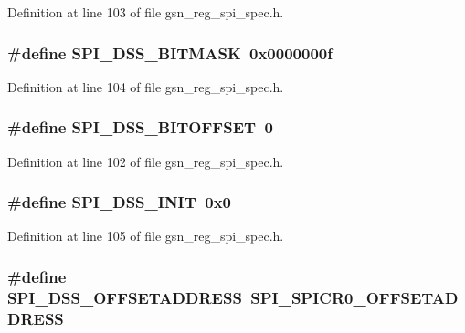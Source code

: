 Definition at line 103 of file gsn\_\-reg\_\-spi\_\-spec.h.

\hypertarget{a00573_acc736a501ece37e3af089e36aef09e1a}{
\subsubsection[{SPI\_\-DSS\_\-BITMASK}]{\setlength{\rightskip}{0pt plus 5cm}\#define SPI\_\-DSS\_\-BITMASK~0x0000000f}}
\label{a00573_acc736a501ece37e3af089e36aef09e1a}


Definition at line 104 of file gsn\_\-reg\_\-spi\_\-spec.h.

\hypertarget{a00573_a64161d7def53cf9e0b0e9e1a0d4ac089}{
\subsubsection[{SPI\_\-DSS\_\-BITOFFSET}]{\setlength{\rightskip}{0pt plus 5cm}\#define SPI\_\-DSS\_\-BITOFFSET~0}}
\label{a00573_a64161d7def53cf9e0b0e9e1a0d4ac089}


Definition at line 102 of file gsn\_\-reg\_\-spi\_\-spec.h.

\hypertarget{a00573_a0c0022af9d0104db02024619d436370b}{
\subsubsection[{SPI\_\-DSS\_\-INIT}]{\setlength{\rightskip}{0pt plus 5cm}\#define SPI\_\-DSS\_\-INIT~0x0}}
\label{a00573_a0c0022af9d0104db02024619d436370b}


Definition at line 105 of file gsn\_\-reg\_\-spi\_\-spec.h.

\hypertarget{a00573_ab5d56d9885baed2699e3cf00e670bfcc}{
\subsubsection[{SPI\_\-DSS\_\-OFFSETADDRESS}]{\setlength{\rightskip}{0pt plus 5cm}\#define SPI\_\-DSS\_\-OFFSETADDRESS~SPI\_\-SPICR0\_\-OFFSETADDRESS}}
\label{a00573_ab5d56d9885baed2699e3cf00e670bfcc}


